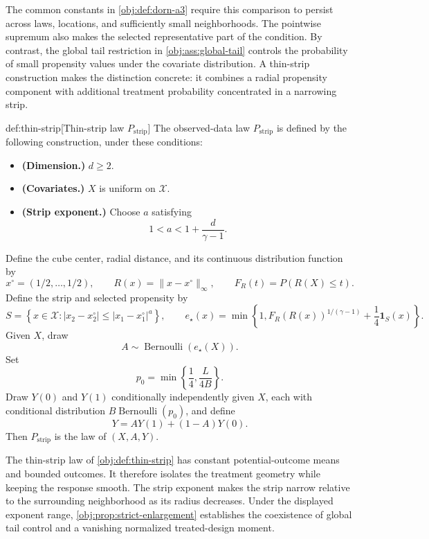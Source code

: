 \documentclass[11pt]{article}
\begin{document}
The common constants in \cref{obj:def:dorn-a3} require this comparison to persist across laws, locations, and sufficiently small neighborhoods. The pointwise supremum also makes the selected representative part of the condition. By contrast, the global tail restriction in \cref{obj:ass:global-tail} controls the probability of small propensity values under the covariate distribution. A thin-strip construction makes the distinction concrete: it combines a radial propensity component with additional treatment probability concentrated in a narrowing strip.

\begin{definitionv}{def:thin-strip}[Thin-strip law $P_{\mathrm{strip}}$]
The observed-data law \(P_{\mathrm{strip}}\) is defined by the following construction, under these conditions:
\begin{itemize}
\item \textbf{(Dimension.)} \(d\ge2\).
\item \textbf{(Covariates.)} \(X\) is uniform on \(\mathcal X\).
\item \textbf{(Strip exponent.)} Choose \(a\) satisfying
\[
1<a<1+\frac{d}{\gamma-1}.
\]
\end{itemize}
Define the cube center, radial distance, and its continuous distribution function by
\[
x^\circ=(1/2,\ldots,1/2),
\qquad
R(x)=\|x-x^\circ\|_\infty,
\qquad
F_R(t)=P(R(X)\le t).
\]
Define the strip and selected propensity by
\[
S=\left\{x\in\mathcal X:
|x_2-x_2^\circ|\le |x_1-x_1^\circ|^a\right\},
\qquad
e_\star(x)=
\min\left\{1,F_R(R(x))^{1/(\gamma-1)}
+\frac14\mathbf 1_S(x)\right\}.
\]
Given \(X\), draw
\[
A\sim\operatorname{Bernoulli}(e_\star(X)).
\]
Set
\[
p_0=\min\left\{\frac14,\frac{L}{4B}\right\}.
\]
Draw \(Y(0)\) and \(Y(1)\) conditionally independently given \(X\), each with conditional distribution \(B\operatorname{Bernoulli}(p_0)\), and define
\[
Y=AY(1)+(1-A)Y(0).
\]
Then \(P_{\mathrm{strip}}\) is the law of \((X,A,Y)\).
\end{definitionv}

The thin-strip law  of \cref{obj:def:thin-strip} has constant potential-outcome means and bounded outcomes. It therefore isolates the treatment geometry while keeping the response smooth. The strip exponent makes the strip narrow relative to the surrounding neighborhood as its radius decreases. Under the displayed exponent range, \cref{obj:prop:strict-enlargement} establishes the coexistence of global tail control and a vanishing normalized treated-design moment.
\end{document}
